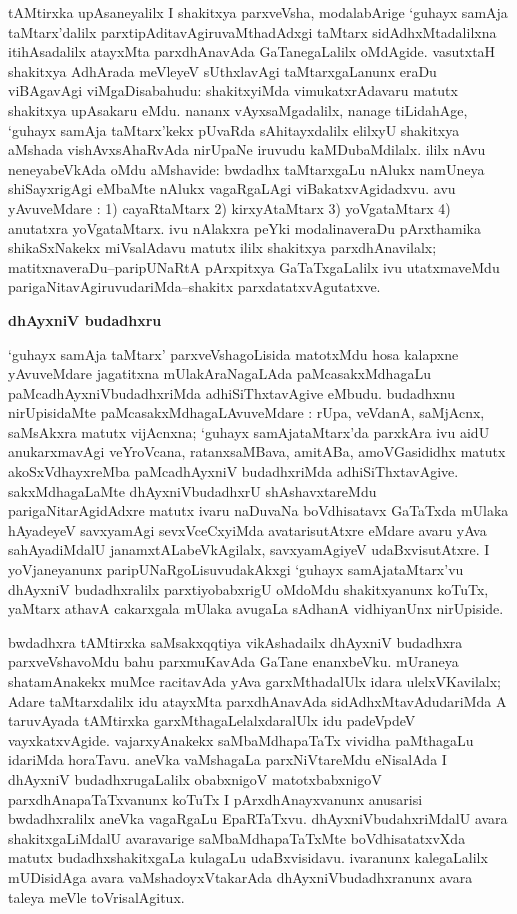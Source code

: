 tAMtirxka upAsaneyalilx I shakitxya parxveVsha, modalabArige `guhayx samAja taMtarx'dalilx parxtipAditavAgiruvaMthadAdxgi taMtarx sidAdhxMtadalilxna itihAsadalilx atayxMta parxdhAnavAda GaTanegaLalilx oMdAgide. vasutxtaH shakitxya AdhArada meVleyeV sUthxlavAgi taMtarxgaLanunx eraDu viBAgavAgi viMgaDisabahudu: shakitxyiMda vimukatxrAdavaru matutx shakitxya upAsakaru eMdu. nananx vAyxsaMgadalilx, nanage tiLidahAge, `guhayx samAja taMtarx'kekx pUvaRda sAhitayxdalilx elilxyU shakitxya aMshada vishAvxsAhaRvAda nirUpaNe iruvudu kaMDubaMdilalx. ililx nAvu neneyabeVkAda oMdu aMshavide: bwdadhx taMtarxgaLu nAlukx namUneya shiSayxrigAgi eMbaMte nAlukx vagaRgaLAgi viBakatxvAgidadxvu. avu yAvuveMdare : {\rm 1)} cayaRtaMtarx {\rm 2)} kirxyAtaMtarx {\rm 3)} yoVgataMtarx {\rm 4)} anutatxra yoVgataMtarx. ivu nAlakxra peYki modalinaveraDu pArxthamika shikaSxNakekx miVsalAdavu matutx ililx shakitxya parxdhAnavilalx; matitxnaveraDu--paripUNaRtA pArxpitxya GaTaTxgaLalilx ivu utatxmaveMdu parigaNitavAgiruvudariMda--shakitx parxdatatxvAgutatxve. 

\bigskip
\begin{center}
{\Large\bf dhAyxniV budadhxru}
\end{center}

`guhayx samAja taMtarx' parxveVshagoLisida matotxMdu hosa kalapxne yAvuveMdare jagatitxna mUlakAraNagaLAda paMcasakxMdhagaLu paMcadhAyxniVbudadhxriMda adhiSiThxtavAgive eMbudu. budadhxnu nirUpisidaMte paMcasakxMdhagaLAvuveMdare : rUpa, veVdanA, saMjAcnx, saMsAkxra matutx vijAcnxna; `guhayx samAjataMtarx'da parxkAra ivu aidU anukarxmavAgi veYroVcana, ratanxsaMBava, amitABa, amoVGasididhx matutx akoSxVdhayxreMba paMcadhAyxniV budadhxriMda adhiSiThxtavAgive. sakxMdhagaLaMte dhAyxniVbudadhxrU shAshavxtareMdu parigaNitarAgidAdxre matutx ivaru naDuvaNa boVdhisatavx GaTaTxda mUlaka hAyadeyeV savxyamAgi sevxVceCxyiMda avatarisutAtxre eMdare avaru yAva sahAyadiMdalU janamxtALabeVkAgilalx, savxyamAgiyeV udaBxvisutAtxre. I yoVjaneyanunx paripUNaRgoLisuvudakAkxgi `guhayx samAjataMtarx'vu dhAyxniV budadhxralilx parxtiyobabxrigU oMdoMdu shakitxyanunx koTuTx, yaMtarx athavA cakarxgala mUlaka avugaLa sAdhanA vidhiyanUnx nirUpiside.

bwdadhxra tAMtirxka saMsakxqqtiya vikAshadailx dhAyxniV budadhxra parxveVshavoMdu bahu parxmuKavAda GaTane enanxbeVku. mUraneya shatamAnakekx muMce racitavAda yAva garxMthadalUlx idara ulelxVKavilalx; Adare taMtarxdalilx idu atayxMta parxdhAnavAda sidAdhxMtavAdudariMda A taruvAyada tAMtirxka garxMthagaLelalxdaralUlx idu padeVpdeV vayxkatxvAgide. vajarxyAnakekx saMbaMdhapaTaTx vividha paMthagaLu idariMda horaTavu. aneVka vaMshagaLa parxNiVtareMdu eNisalAda I dhAyxniV budadhxrugaLalilx obabxnigoV matotxbabxnigoV parxdhAnapaTaTxvanunx koTuTx I pArxdhAnayxvanunx anusarisi bwdadhxralilx aneVka vagaRgaLu EpaRTaTxvu. dhAyxniVbudahxriMdalU avara shakitxgaLiMdalU avaravarige saMbaMdhapaTaTxMte boVdhisatatxvXda matutx budadhxshakitxgaLa kulagaLu udaBxvisidavu. ivaranunx kalegaLalilx mUDisidAga avara vaMshadoyxVtakarAda dhAyxniVbudadhxranunx avara taleya meVle toVrisalAgitux.

